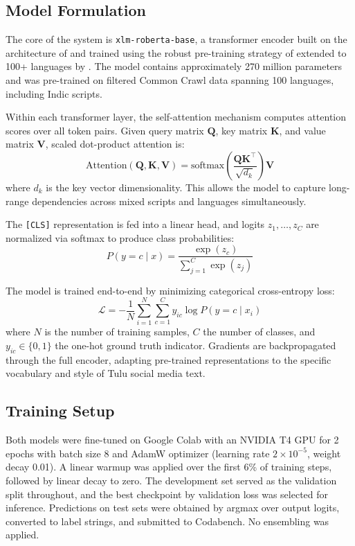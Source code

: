 \documentclass[11pt]{article}
\begin{document}
\subsection{Model Formulation}

The core of the system is \texttt{xlm-roberta-base},
a transformer encoder built on the architecture of
\citet{vaswani2017} and trained using the robust
pre-training strategy of \citet{liu2019} extended to
100+ languages by \citet{conneau2020}. The model
contains approximately 270 million parameters and
was pre-trained on filtered Common Crawl data
spanning 100 languages, including Indic scripts.

Within each transformer layer, the self-attention
mechanism computes attention scores over all token pairs. Given query matrix $\mathbf{Q}$, key matrix $\mathbf{K}$,
and value matrix $\mathbf{V}$, scaled dot-product attention
is:
\begin{equation}
\text{Attention}(\mathbf{Q}, \mathbf{K}, \mathbf{V}) = \text{softmax}\!\left(\frac{\mathbf{Q}\mathbf{K}^\top}{\sqrt{d_k}}\right)\mathbf{V}
\end{equation}
where $d_k$ is the key vector dimensionality. This allows the model to capture long-range dependencies
across mixed scripts and languages simultaneously.

The \texttt{[CLS]} representation is fed into a linear
head, and logits $z_1, \ldots, z_C$ are normalized via softmax to produce class probabilities:
\begin{equation}
P(y = c \mid x) = \frac{\exp(z_c)}{\sum_{j=1}^{C} \exp(z_j)}
\end{equation}

The model is trained end-to-end by minimizing
categorical cross-entropy loss:
\begin{equation}
\mathcal{L} = -\frac{1}{N}\sum_{i=1}^{N}\sum_{c=1}^{C} y_{ic} \log P(y = c \mid x_i)
\end{equation}
where $N$ is the number of training samples, $C$
the number of classes, and $y_{ic} \in \{0,1\}$ the one-hot ground truth indicator. Gradients are backpropagated through the full encoder, adapting pre-trained representations to the specific vocabulary
and style of Tulu social media text.

\subsection{Training Setup}

Both models were fine-tuned on Google Colab with
an NVIDIA T4 GPU for 2 epochs with batch size 8
and AdamW optimizer (learning rate $2\times10^{-5}$,
weight decay 0.01). A linear warmup was applied
over the first 6\% of training steps, followed by linear decay to zero. The development set served as
the validation split throughout, and the best checkpoint by validation loss was selected for inference.
Predictions on test sets were obtained by argmax
over output logits, converted to label strings, and
submitted to Codabench. No ensembling was applied.
\end{document}
